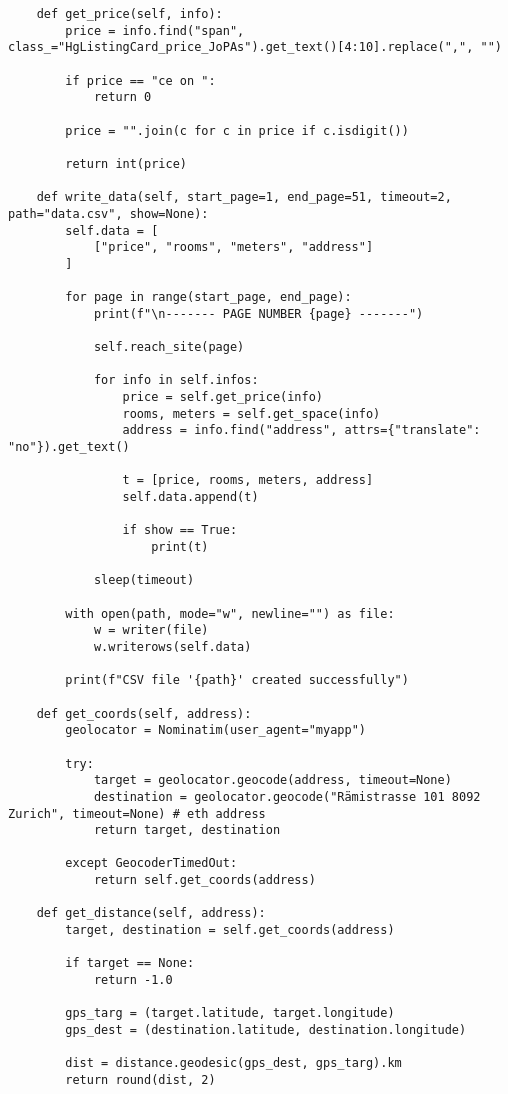\documentclass[12pt]{article}
\begin{document}
\begin{lstlisting}
    def get_price(self, info):
        price = info.find("span", class_="HgListingCard_price_JoPAs").get_text()[4:10].replace(",", "")

        if price == "ce on ":
            return 0

        price = "".join(c for c in price if c.isdigit())

        return int(price)

    def write_data(self, start_page=1, end_page=51, timeout=2, path="data.csv", show=None):
        self.data = [
            ["price", "rooms", "meters", "address"]
        ]

        for page in range(start_page, end_page):
            print(f"\n------- PAGE NUMBER {page} -------")

            self.reach_site(page)

            for info in self.infos:
                price = self.get_price(info)
                rooms, meters = self.get_space(info)
                address = info.find("address", attrs={"translate": "no"}).get_text()
                
                t = [price, rooms, meters, address]
                self.data.append(t)

                if show == True:
                    print(t)

            sleep(timeout)

        with open(path, mode="w", newline="") as file:
            w = writer(file)
            w.writerows(self.data)

        print(f"CSV file '{path}' created successfully")

    def get_coords(self, address):
        geolocator = Nominatim(user_agent="myapp")

        try:
            target = geolocator.geocode(address, timeout=None)
            destination = geolocator.geocode("Rämistrasse 101 8092 Zurich", timeout=None) # eth address
            return target, destination

        except GeocoderTimedOut:
            return self.get_coords(address)

    def get_distance(self, address):
        target, destination = self.get_coords(address)

        if target == None:
            return -1.0

        gps_targ = (target.latitude, target.longitude)
        gps_dest = (destination.latitude, destination.longitude)

        dist = distance.geodesic(gps_dest, gps_targ).km
        return round(dist, 2)


\end{lstlisting}
\end{document}
